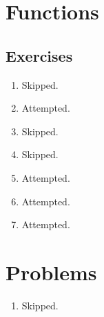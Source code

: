 \section{Functions}
\subsection*{Exercises}
\begin{enumerate}[\thesection-1]
%
\item Skipped.
%
\item Attempted.
%
\item Skipped.
%
\item Skipped.
%
\item Attempted.
%
\item Attempted.
%
\item Attempted.
%
\end{enumerate}

\section*{Problems}
\begin{enumerate}[\thechapter-1]
%
\item Skipped.
%
\end{enumerate}

